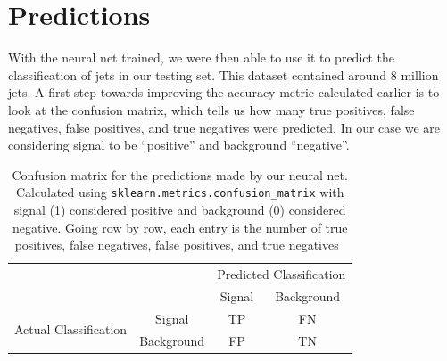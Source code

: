 \documentclass[11pt]{article}
\numberwithin{equation}{section}
\numberwithin{figure}{section}
\numberwithin{table}{section}
\begin{document}
\section{Predictions}\label{sec:Predictions}
With the neural net trained, we were then able to use it to predict the classification of jets in our testing set. This dataset contained around 8 million jets. A first step towards improving the accuracy metric calculated earlier is to look at the confusion matrix, which tells us how many true positives, false negatives, false positives, and true negatives were predicted. In our case we are considering signal to be ``positive'' and background ``negative''.


\begin{table}[H]
    \centering
    \begin{tabular}{cccc}
        \multicolumn{2}{c}{\multirow{2}{*}{}} & \multicolumn{2}{c}{Predicted Classification} \\ \cmidrule{3-4}
        \multicolumn{2}{c}{} & Signal & Background \\ \cmidrule(lr){3-3} \cmidrule(lr){4-4}
        \multirow{2}{*}{Actual Classification} & Signal & TP & FN \\ \cmidrule(lr){2-2}
        & Background & FP & TN \\ \cmidrule(lr){2-2}
    \end{tabular}
    \caption{Confusion matrix for the predictions made by our neural net. Calculated using \texttt{sklearn.metrics.confusion\_matrix} with signal (1) considered positive and background (0) considered negative. Going row by row, each entry is the number of true positives, false negatives, false positives, and true negatives~}
    \label{tab:conf_matrix}
\end{table}

\newpage
\printbibliography
\end{document}
